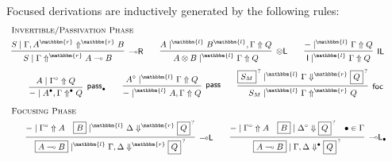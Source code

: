 \documentclass[runningheads]{llncs}
\newcommand{\tl}{\otimes \mathsf{L}}
\newcommand{\lright}{{\multimap}\mathsf{R}}
\newcommand{\lleft}{{\multimap}\mathsf{L}}
\newcommand{\pass}{\mathsf{pass}}
\newcommand{\unitl}{\mathsf{IL}}
\newcommand{\otL}{\tl}
\newcommand{\lolliR}{\lright}
\newcommand{\lolliL}{\lleft}
\newcommand{\IL}{\unitl}
\newcommand{\ot}{\otimes}
\newcommand{\lolli}{\multimap}
\newcommand{\I}{\mathsf{I}}
\newcommand{\LI}{\mathsf{LI}}
\newcommand{\Pass}{\mathsf{P}}
\newcommand{\xvdash}{\vdash^{x}}
\newcommand{\up}{\Uparrow}
\newcommand{\dn}{\Downarrow}
\newcommand{\sw}{\mathsf{sw}}
\newcommand{\focL}{\mathsf{foc_L}}
\newcommand{\foc}{\mathsf{foc}}
\newcommand{\focR}{\mathsf{foc_R}}
\newcommand{\focLR}{\mathsf{foc_{M}}}
\renewcommand{\r}{\mathbbm{r}}
\renewcommand{\l}{\mathbbm{l}}
\begin{document}
Focused derivations are inductively generated by the following rules:
\begin{equation}\label{fig:max-multi-focus}\small
  \begin{array}{c}
    \multicolumn{1}{l}{\text{\textsc{Invertible/Passivation Phase}}} \\[4pt]
      \infer[\lolliR]{S \mid \Gamma \up^{\r} A \lolli B}{S \mid \Gamma , A^{\r} \up^{\r} B}
    \qquad
    \infer[\otL]{A \ot B \mid^\l \Gamma \up Q}{A \mid^\l  B^{\l} , \Gamma \up Q}
    \qquad
      \infer[\IL]{\I \mid^\l \Gamma \up Q}{- \mid^\l \Gamma \up Q}    
    \qquad
    \\[6pt]    
    \infer[\pass_\bullet]{- \mid A^{\bullet} , \Gamma \up^{\bullet} Q }{
      A\mid \Gamma^{\circ} \up Q
    }
    \qquad
    \infer[\pass]{- \mid^{\l} A , \Gamma \up Q }{
      A^\circ \mid^{\l} \Gamma \up Q
    }
    \qquad
        \infer[\foc]{S_M \mid^{\l} \Gamma \up^{\r} Q}{
      \fbox{$S_M$}^{\, ?} \mid^\l \Gamma \dn^{\r} \fbox{$Q$}^{\, ?}
    }
    \\[9pt]
    \multicolumn{1}{l}{\text{\textsc{Focusing Phase}}} \\[4pt]
    \infer[\lolliL]{\fbox{$A \lolli B$} \mid^\l \Gamma , \Delta \dn^\r \fbox{$Q$}^{\,?}}{
      - \mid \Gamma^\circ \up A
      &
      \fbox{$B$} \mid^\l \Delta \dn^\r \fbox{$Q$}^{\,?}
    }
    \qquad
    \infer[\lolliL_\bullet]{\fbox{$A \lolli B$} \mid \Gamma , \Delta \dn^\bullet \fbox{$Q$}^{\,?}}{
      - \mid \Gamma^{\circ} \up A
      &
      \fbox{$B$} \mid \Delta^{\circ} \dn \fbox{$Q$}^{\,?}
      &
      \bullet \in \Gamma
}
\end{array}
\end{equation}
\end{document}
